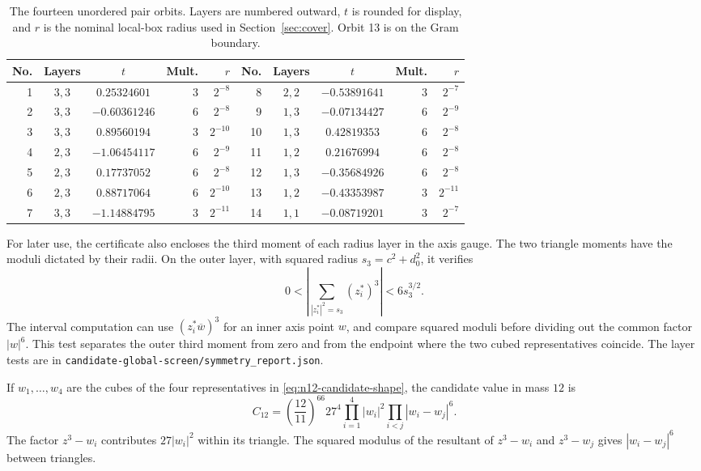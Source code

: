 \documentclass[11pt,letterpaper]{article}
\theoremstyle{remark}
\begin{document}
\begin{table}[tb]
\centering
\small
\setlength{\tabcolsep}{4pt}
\begin{tabular}{@{}rccrr@{\quad}rccrr@{}}
\toprule
No. & Layers & \(t\) & Mult. & \(r\) &
No. & Layers & \(t\) & Mult. & \(r\)\\
\midrule
1  & \(3,3\) & \( 0.25324601\) & 3 & \(2^{-8}\) &
8  & \(2,2\) & \(-0.53891641\) & 3 & \(2^{-7}\)\\
2  & \(3,3\) & \(-0.60361246\) & 6 & \(2^{-8}\) &
9  & \(1,3\) & \(-0.07134427\) & 6 & \(2^{-9}\)\\
3  & \(3,3\) & \( 0.89560194\) & 3 & \(2^{-10}\) &
10 & \(1,3\) & \( 0.42819353\) & 6 & \(2^{-8}\)\\
4  & \(2,3\) & \(-1.06454117\) & 6 & \(2^{-9}\) &
11 & \(1,2\) & \( 0.21676994\) & 6 & \(2^{-8}\)\\
5  & \(2,3\) & \( 0.17737052\) & 6 & \(2^{-8}\) &
12 & \(1,3\) & \(-0.35684926\) & 6 & \(2^{-8}\)\\
6  & \(2,3\) & \( 0.88717064\) & 6 & \(2^{-10}\) &
13 & \(1,2\) & \(-0.43353987\) & 3 & \(2^{-11}\)\\
7  & \(3,3\) & \(-1.14884795\) & 3 & \(2^{-11}\) &
14 & \(1,1\) & \(-0.08719201\) & 3 & \(2^{-7}\)\\
\bottomrule
\end{tabular}
\caption{The fourteen unordered pair orbits. Layers are numbered outward,
\(t\) is rounded for display, and \(r\) is the nominal local-box radius used
in Section~\ref{sec:cover}. Orbit 13 is on the Gram boundary.}
\label{tab:contacts}
\end{table}

For later use, the certificate also encloses the third moment of each radius layer in the axis gauge. The two triangle moments have the moduli dictated by their radii. On the outer layer, with squared radius $s_3=c^2+d_0^2$, it verifies
\[
 0<\left|\sum_{|z_i^*|^2=s_3}(z_i^*)^3\right|<6s_3^{3/2}.
\]
The interval computation can use $(z_i^*\overline w)^3$ for an inner axis point $w$, and compare squared moduli before dividing out the common factor $|w|^6$. This test separates the outer third moment from zero and from the endpoint where the two cubed representatives coincide. The layer tests are in \texttt{candidate-global-screen/symmetry\_report.json}.

If $w_1,\ldots,w_4$ are the cubes of the four representatives in \eqref{eq:n12-candidate-shape}, the candidate value in mass $12$ is
\begin{equation}
 C_{12}=\left(\frac{12}{11}\right)^{66}
 27^4\prod_{i=1}^4|w_i|^2\prod_{i<j}|w_i-w_j|^6.
 \label{eq:n12-candidate-value}
\end{equation}
The factor $z^3-w_i$ contributes $27|w_i|^2$ within its triangle. The squared modulus of the resultant of $z^3-w_i$ and $z^3-w_j$ gives $|w_i-w_j|^6$ between triangles.
\end{document}
